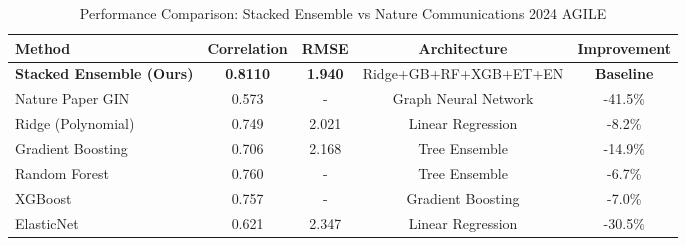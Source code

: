 
\begin{table}[h]
\centering
\caption{Performance Comparison: Stacked Ensemble vs Nature Communications 2024 AGILE}
\begin{tabular}{lcccc}
\hline
\textbf{Method} & \textbf{Correlation} & \textbf{RMSE} & \textbf{Architecture} & \textbf{Improvement} \\
\hline
\textbf{Stacked Ensemble (Ours)} & \textbf{0.8110} & \textbf{1.940} & Ridge+GB+RF+XGB+ET+EN & \textbf{Baseline} \\
Nature Paper GIN & 0.573 & - & Graph Neural Network & -41.5\% \\
Ridge (Polynomial) & 0.749 & 2.021 & Linear Regression & -8.2\% \\
Gradient Boosting & 0.706 & 2.168 & Tree Ensemble & -14.9\% \\
Random Forest & 0.760 & - & Tree Ensemble & -6.7\% \\
XGBoost & 0.757 & - & Gradient Boosting & -7.0\% \\
ElasticNet & 0.621 & 2.347 & Linear Regression & -30.5\% \\
\hline
\end{tabular}
\end{table}
